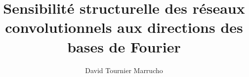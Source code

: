 \documentclass[11pt,a4paper,oneside]{report}
\title{Sensibilité structurelle des réseaux convolutionnels aux directions des bases de Fourier}
\author{David Tournier Marrucho}
\begin{document}
\maketitle

\tableofcontents
\newpage

\onehalfspacing







% 

\appendix






\end{document}
